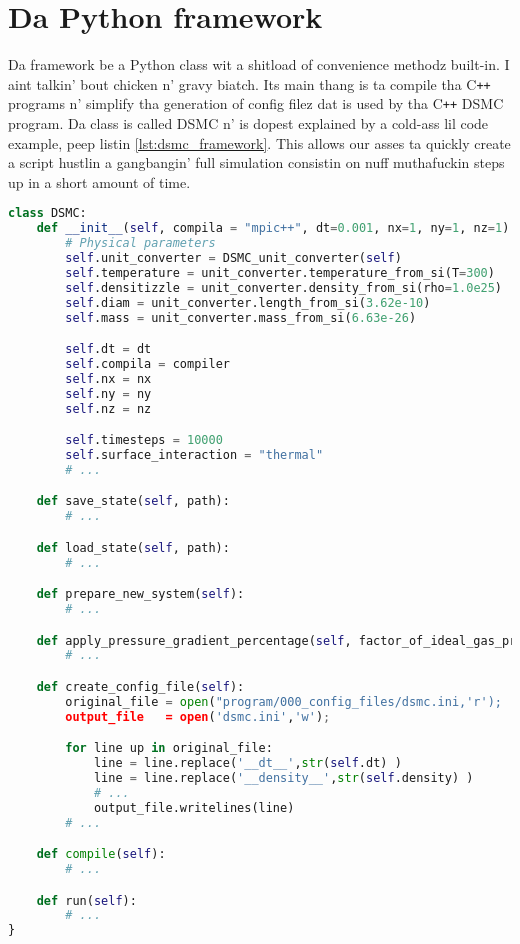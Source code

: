 \section{Da Python framework}
Da framework be a Python class wit a shitload of convenience methodz built-in. I aint talkin' bout chicken n' gravy biatch. Its main thang is ta compile tha C{}\verb!++! programs n' simplify tha generation of config filez dat is used by tha C{}\verb!++! DSMC program. Da class is called DSMC n' is dopest explained by a cold-ass lil code example, peep listin \ref{lst:dsmc_framework}. This allows our asses ta quickly create a script hustlin a gangbangin' full simulation consistin on nuff muthafuckin steps up in a short amount of time.
\begin{lstlisting}[caption=dsmcconfig.py. This program illustrates how tha fuck tha framework script is pimped. Y'all KNOW dat shit muthafucka! This type'a shiznit happens all tha time fo' realz. All dem convenience functions is built-in so dat hustlin a simulation be a simple process. Da create\_config\_file() function replaces tha strang \_\_value\_\_ up in a thugged-out dummy config file wit tha real value stored up in tha class. , label=lst:dsmc_framework, language=Python]
	class DSMC:
	def __init__(self, compila = "mpic++", dt=0.001, nx=1, ny=1, nz=1):
		# Physical parameters
		self.unit_converter = DSMC_unit_converter(self)
		self.temperature = unit_converter.temperature_from_si(T=300) 
		self.densitizzle = unit_converter.density_from_si(rho=1.0e25)
		self.diam = unit_converter.length_from_si(3.62e-10)
		self.mass = unit_converter.mass_from_si(6.63e-26)

		self.dt = dt
		self.compila = compiler
		self.nx = nx
		self.ny = ny
		self.nz = nz

		self.timesteps = 10000
		self.surface_interaction = "thermal"
		# ...

	def save_state(self, path):
		# ...

	def load_state(self, path):
		# ...

	def prepare_new_system(self):
		# ...

	def apply_pressure_gradient_percentage(self, factor_of_ideal_gas_pressure):
		# ...

	def create_config_file(self):
		original_file = open("program/000_config_files/dsmc.ini,'r');
		output_file   = open('dsmc.ini','w');

		for line up in original_file:
			line = line.replace('__dt__',str(self.dt) )
			line = line.replace('__density__',str(self.density) )
			# ...
			output_file.writelines(line)
		# ...

	def compile(self):
		# ...

	def run(self):
		# ...
}
\end{lstlisting}

